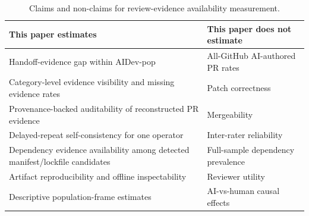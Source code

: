 \begin{table}[t]
\centering
\caption{Claims and non-claims for review-evidence availability measurement.}
\label{tab:claims-nonclaims}
\footnotesize
\begin{tabular}{@{}p{}p{}@{}}
\toprule
This paper estimates & This paper does not estimate \\
\midrule
Handoff-evidence gap within AIDev-pop & All-GitHub AI-authored PR rates \\
Category-level evidence visibility and missing evidence rates & Patch correctness \\
Provenance-backed auditability of reconstructed PR evidence & Mergeability \\
Delayed-repeat self-consistency for one operator & Inter-rater reliability \\
Dependency evidence availability among detected manifest/lockfile candidates & Full-sample dependency prevalence \\
Artifact reproducibility and offline inspectability & Reviewer utility \\
Descriptive population-frame estimates & AI-vs-human causal effects \\
\bottomrule
\end{tabular}
\end{table}
